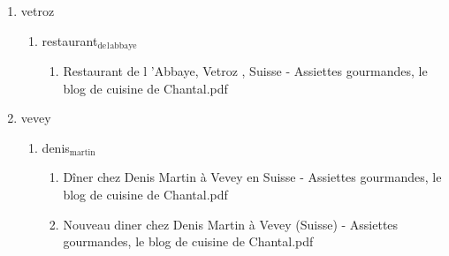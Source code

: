 \documentclass[11pt]{article}
\begin{document}
\begin{enumerate}
\item vetroz
\label{sec-1-1-1-1-21-10-8-5}
\begin{enumerate}
\item restaurant$_{\text{de}}$$_{\text{l}}$$_{\text{abbaye}}$
\label{sec-1-1-1-1-21-10-8-5-1}
\begin{enumerate}
\item Restaurant de l 'Abbaye, Vetroz , Suisse - Assiettes gourmandes, le blog de cuisine de Chantal.pdf
\label{sec-1-1-1-1-21-10-8-5-1-1}
\end{enumerate}
\end{enumerate}

\item vevey
\label{sec-1-1-1-1-21-10-8-6}
\begin{enumerate}
\item denis$_{\text{martin}}$
\label{sec-1-1-1-1-21-10-8-6-1}
\begin{enumerate}
\item Dîner chez Denis Martin à Vevey en Suisse - Assiettes gourmandes, le blog de cuisine de Chantal.pdf
\label{sec-1-1-1-1-21-10-8-6-1-1}

\item Nouveau diner chez Denis Martin à Vevey (Suisse) - Assiettes gourmandes, le blog de cuisine de Chantal.pdf
\label{sec-1-1-1-1-21-10-8-6-1-2}
\end{enumerate}
\end{enumerate}
\end{enumerate}
\end{document}
